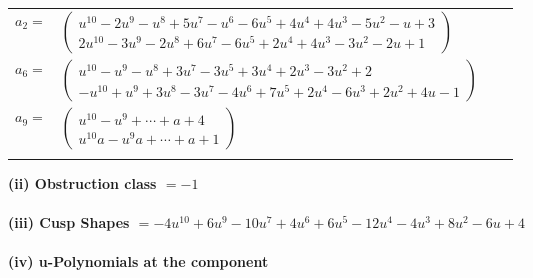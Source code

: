 \documentclass[1p]{elsarticle_modified}
\theoremstyle{definition}
\begin{document}
\begin{tabular}{m{7pt} m{180pt} m{7pt} m{180pt} }
\flushright $a_{2}=$&$\begin{pmatrix}u^{10}-2 u^9- u^8+5 u^7- u^6-6 u^5+4 u^4+4 u^3-5 u^2- u+3\\2 u^{10}-3 u^9-2 u^8+6 u^7-6 u^5+2 u^4+4 u^3-3 u^2-2 u+1\end{pmatrix}$ \\
\flushright $a_{6}=$&$\begin{pmatrix}u^{10}- u^9- u^8+3 u^7-3 u^5+3 u^4+2 u^3-3 u^2+2\\- u^{10}+u^9+3 u^8-3 u^7-4 u^6+7 u^5+2 u^4-6 u^3+2 u^2+4 u-1\end{pmatrix}$ \\
\flushright $a_{9}=$&$\begin{pmatrix}u^{10}- u^9+\cdots+a+4\\u^{10} a- u^9 a+\cdots+a+1\end{pmatrix}$\\&\end{tabular}
\flushleft \textbf{(ii) Obstruction class $= -1$}\\~\\
\flushleft \textbf{(iii) Cusp Shapes $= -4 u^{10}+6 u^9-10 u^7+4 u^6+6 u^5-12 u^4-4 u^3+8 u^2-6 u+4$}\\~\\
\newpage\renewcommand{\arraystretch}{1}
\flushleft \textbf{(iv) u-Polynomials at the component}\newline \\
\end{document}
